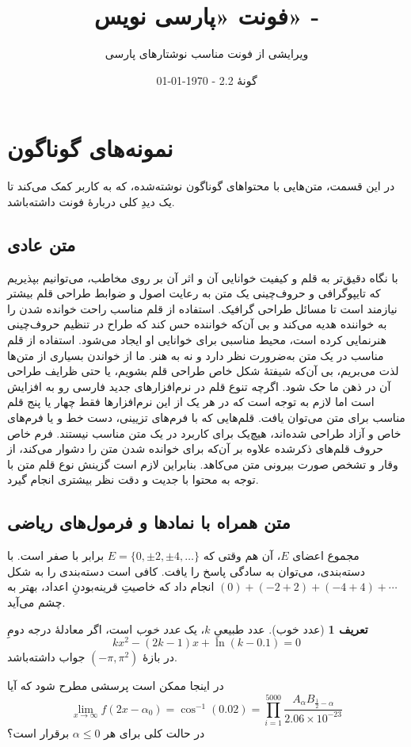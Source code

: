 \documentclass[10pt,a5paper]{article}
\title{\textbf{فونت «پارسی نویس» - \lr{``Parsi Nevis''}}}
\author{ویرایشی از فونت \lr{Scheherazade New} مناسب نوشتارهای پارسی}
\date{%
گونۀ 2.2
\quad - \quad \today \\
\lr{Version 2.2 \quad - \quad \latintoday}
}
\theoremstyle{definition}
\newtheorem{definition}{تعریف}[section]
\theoremstyle{plain}
\begin{document}
\maketitle

\section{نمونه‌های گوناگون}
در این قسمت، متن‌هایی با محتواهای گوناگون نوشته‌شده، که به کاربر کمک می‌کند تا یک دیدِ کلی دربارۀ فونت داشته‌باشد.

\subsection{متن عادی}
با نگاه دقیق‌تر به قلم و کیفیت خوانایی آن و اثر آن بر روی مخاطب، می‌توانیم بپذیریم که تایپوگرافی و حروف‌چینی یک متن به رعایت اصول و ضوابط طراحی قلم بیشتر نیازمند است تا مسائل طراحی گرافیک. استفاده از قلم مناسب راحت خوانده شدن را به خواننده هدیه می‌کند و بی آن‌که خواننده حس کند که طراح در تنظیم حروف‌چینی هنرنمایی کرده است، محیط مناسبی برای خوانایی او ایجاد می‌شود. استفاده از قلم مناسب در یک متن به‌ضرورت نظر دارد و نه به هنر. ما از خواندن بسیاری از متن‌ها لذت می‌بریم، بی آن‌که شیفتهٔ شکل خاص طراحی قلم بشویم، یا حتی ظرایف طراحی آن در ذهن ما حک شود. اگرچه تنوع قلم در نرم‌افزارهای جدید فارسی رو به افزایش است اما لازم به توجه است که در هر یک از این نرم‌افزارها فقط چهار یا پنج قلم مناسب برای متن می‌توان یافت. قلم‌هایی که با فرم‌های تزیینی، دست خط و یا فرم‌های خاص و آزاد طراحی شده‌اند، هیچ‌یک برای کاربرد در یک متن مناسب نیستند. فرم خاص حروف قلم‌های ذکرشده علاوه بر آن‌که برای خوانده شدن متن را دشوار می‌کند، از وقار و تشخص صورت بیرونی متن می‌کاهد. بنابراین لازم است گزینش نوع قلم متن با توجه به محتوا با جدیت و دقت نظر بیشتری انجام گیرد.

\subsection{متن همراه با نمادها و فرمول‌های ریاضی}
مجموع اعضای $E$، آن هم وقتی که $E=\{0,\pm2,\pm4,\ldots\}$ برابر با صفر است. با دسته‌بندی، می‌توان به سادگی پاسخ را یافت. کافی است دسته‌بندی را به شکل $(0)+(-2+2)+(-4+4)+\cdots$ انجام داد که خاصیتِ قرینه‌بودنِ اعداد، بهتر به چشم می‌آید.
\begin{definition}[عدد خوب]
عدد طبیعیِ $k$، یک \emph{عدد خوب }است، اگر معادلۀ درجه دومِ
\[kx^2-(2k-1)x+\ln(k-0.1)=0\]
در بازۀ $(-\pi,\pi^2)$ جواب داشته‌باشد.
\end{definition}
در اینجا ممکن است پرسشی مطرح شود که آیا
\[\lim_{x\to\infty} f(2x-\alpha_0)=\cos^{-1}(0.02)
=\prod_{i=1}^{5000} \frac{A_\alpha B_{\frac{1}{2}-\alpha}}{2.06\times10^{-23}}
\]
در حالت کلی برای هر $\alpha\leq0$ برقرار است؟
\end{document}
